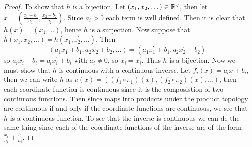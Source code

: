     \question 

    \begin{proof}
        To show that $h$ is a bijection, Let $(x_1, x_2, \dots) \in \mathbb{R}^\omega$, then let $x = (\frac{x_1 - b_1}{a_1}, \frac{x_2-b_2}{a_2})$. Since $a_i > 0$ each term is well defined. Then it is clear that $h(x) = (x_1, \dots)$, hence 
        $h$ is a surjection. Now suppose that $h(x_1, x_2, \dots) = h(x_1^\prime, x_2^\prime, \dots)$. Then 
        \[(a_1x_1 + b_1, a_2x_2 + b_2, \dots) = (a_1x_1^\prime + b_1, a_2x_2^\prime + b_2)\]
        so $a_ix_i + b_i = a_ix_i^\prime + b_i$ with $a_i \neq 0$, so $x_i = x_i^\prime$. Thus $h$ is a bijection. Now we must show that $h$ is continuous with a continuous inverse. Let $f_i(x) = a_ix + b_i$, then we can write $h$ 
        as $h(x) = ((f_1 \circ \pi_1)(x), (f_2 \circ \pi_2)(x), \dots )$, then each coordinate function is continuous since it is the composistion of two continuous functions. Then since maps into products under the product topology are continuous 
        if and only if the coordinate functions are continuous, we see that $h$ is a continuous function. To see that the inverse is continuous we can do the same thing since each of the coordinate functions of the inverse are of the form 
        $\frac{x_i}{a_i} + \frac{b_i}{a_i}$. 
    \end{proof}
